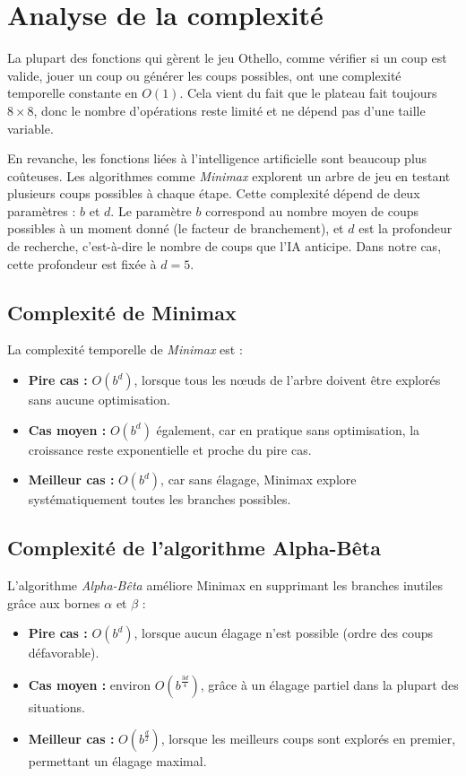 \documentclass{article}
\begin{document}
\section{\textbf{Analyse de la complexité}}

La plupart des fonctions qui gèrent le jeu Othello, comme vérifier si un coup est valide, jouer un coup ou générer les coups possibles, ont une complexité temporelle constante en $O(1)$. Cela vient du fait que le plateau fait toujours $8 \times 8$, donc le nombre d'opérations reste limité et ne dépend pas d'une taille variable.

En revanche, les fonctions liées à l'intelligence artificielle sont beaucoup plus coûteuses. Les algorithmes comme \emph{Minimax} explorent un arbre de jeu en testant plusieurs coups possibles à chaque étape. Cette complexité dépend de deux paramètres : $b$ et $d$. Le paramètre $b$ correspond au nombre moyen de coups possibles à un moment donné (le facteur de branchement), et $d$ est la profondeur de recherche, c'est-à-dire le nombre de coups que l'IA anticipe. Dans notre cas, cette profondeur est fixée à $d = 5$.

\subsection*{Complexité de Minimax}

La complexité temporelle de \emph{Minimax} est :

\begin{itemize}
    \item \textbf{Pire cas :} $O(b^d)$, lorsque tous les nœuds de l'arbre doivent être explorés sans aucune optimisation.
    \item \textbf{Cas moyen :} $O(b^d)$ également, car en pratique sans optimisation, la croissance reste exponentielle et proche du pire cas.
    \item \textbf{Meilleur cas :} $O(b^d)$, car sans élagage, Minimax explore systématiquement toutes les branches possibles.
\end{itemize}

\subsection*{Complexité de l'algorithme Alpha-Bêta}

L'algorithme \emph{Alpha-Bêta} améliore Minimax en supprimant les branches inutiles grâce aux bornes $\alpha$ et $\beta$ :

\begin{itemize}
    \item \textbf{Pire cas :} $O(b^d)$, lorsque aucun élagage n'est possible (ordre des coups défavorable).
    \item \textbf{Cas moyen :} environ $O(b^{\frac{3d}{4}})$, grâce à un élagage partiel dans la plupart des situations.
    \item \textbf{Meilleur cas :} $O(b^{\frac{d}{2}})$, lorsque les meilleurs coups sont explorés en premier, permettant un élagage maximal.
\end{itemize}
\end{document}
